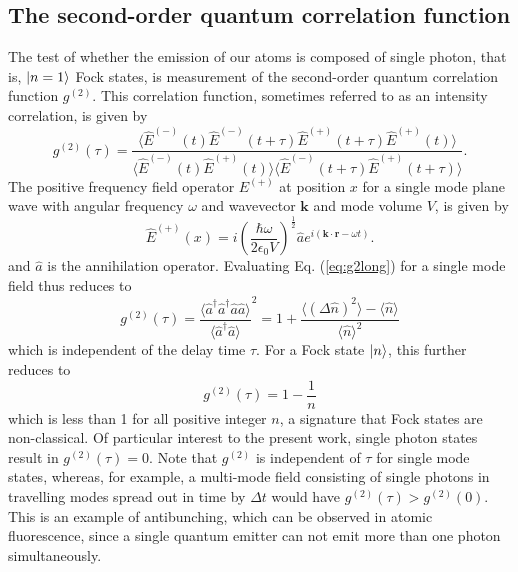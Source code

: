 \subsection{The second-order quantum correlation function}
The test of whether the emission of our atoms is composed of single photon, that is, $\ket{n=1}$ Fock states, is measurement of the second-order quantum correlation function $g^{(2)}$. This correlation function, sometimes referred to as an intensity correlation, is given by\cite{gerry2004introductory}
\begin{equation}\label{eq:g2long}
    g^{(2)}(\tau) = \frac{\langle \hat{E}^{(-)}(t) \hat{E}^{(-)}(t+\tau) \hat{E}^{(+)}(t+\tau) \hat{E}^{(+)}(t) \rangle}{\langle \hat{E}^{(-)}(t) \hat{E}^{(+)}(t) \rangle \langle \hat{E}^{(-)}(t+\tau) \hat{E}^{(+)}(t+\tau) \rangle}.
\end{equation}
The positive frequency field operator $E^{(+)}$ at position $x$ for a single mode plane wave with angular frequency $\omega$ and wavevector $\mathbf{k}$ and mode volume $V$, is given by
\begin{equation}\label{eq:Epositive}
    \hat{E}^{(+)}(x) = i \left(\frac{\hbar \omega}{2 \epsilon_0 V}\right)^{\frac{1}{2}} \hat{a} e^{i(\mathbf{k\cdot r} - \omega t)}.
\end{equation}
and $\hat{a}$ is the annihilation operator. Evaluating Eq. (\ref{eq:g2long}) for a single mode field thus reduces to
\begin{equation}\label{eq:g2singlemode}
    g^{(2)}(\tau) = \frac{\langle \hat{a}^{\dagger}\hat{a}^{\dagger}\hat{a}\hat{a} \rangle}{\langle \hat{a}^{\dagger}\hat{a} \rangle}^2 = 1 + \frac{\langle (\Delta \hat{n})^2 \rangle - \langle \hat{n} \rangle}{\langle \hat{n} \rangle^2}
\end{equation}
which is independent of the delay time $\tau$. For a Fock state $\ket{n}$, this further reduces to 
\begin{equation}\label{eq:g2fock}
    g^{(2)}(\tau) = 1 - \frac{1}{n}
\end{equation}
which is less than 1 for all positive integer $n$, a signature that Fock states are non-classical. Of particular interest to the present work, single photon states result in $g^{(2)}(\tau)=0$. Note that $g^{(2)}$ is independent of $\tau$ for single mode states, whereas, for example, a multi-mode field consisting of single photons in travelling modes spread out in time by $\Delta t$ would have $g^{(2)}(\tau) > g^{(2)}(0)$. This is an example of antibunching, which can be observed in atomic fluorescence\cite{schubert1992photon,volz2007atom}, since a single quantum emitter can not emit more than one photon simultaneously.

